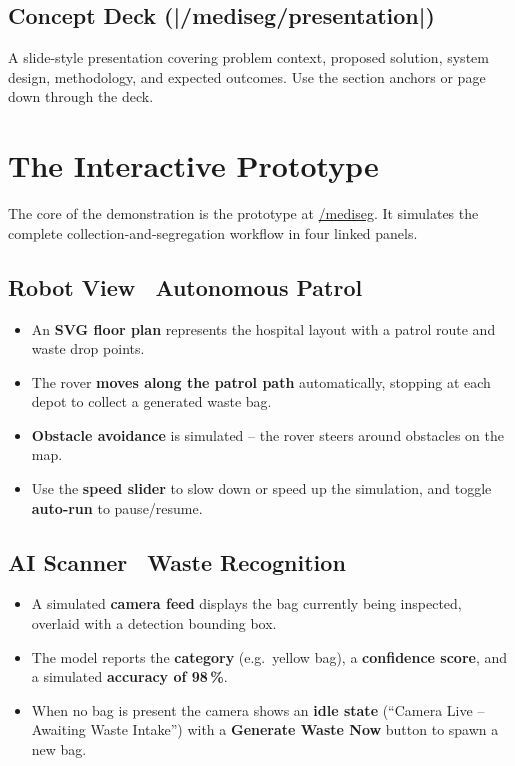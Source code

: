 \documentclass[11pt, a4paper]{article}
\begin{document}
\subsection{Concept Deck (|/mediseg/presentation|)}
A slide-style presentation covering problem context, proposed solution,
system design, methodology, and expected outcomes. Use the section anchors or
page down through the deck.

\section{The Interactive Prototype}

The core of the demonstration is the prototype at \url{/mediseg}. It simulates
the complete collection-and-segregation workflow in four linked panels.

\subsection{Robot View \textperiodcentered\ Autonomous Patrol}
\begin{itemize}[leftmargin=1.6em, itemsep=2pt]
  \item An \textbf{SVG floor plan} represents the hospital layout with a patrol
        route and waste drop points.
  \item The rover \textbf{moves along the patrol path} automatically, stopping
        at each depot to collect a generated waste bag.
  \item \textbf{Obstacle avoidance} is simulated -- the rover steers around
        obstacles on the map.
  \item Use the \textbf{speed slider} to slow down or speed up the simulation,
        and toggle \textbf{auto-run} to pause/resume.
\end{itemize}

\subsection{AI Scanner \textperiodcentered\ Waste Recognition}
\begin{itemize}[leftmargin=1.6em, itemsep=2pt]
  \item A simulated \textbf{camera feed} displays the bag currently being
        inspected, overlaid with a detection bounding box.
  \item The model reports the \textbf{category} (e.g.\ yellow bag), a
        \textbf{confidence score}, and a simulated \textbf{accuracy of 98\,\%}.
  \item When no bag is present the camera shows an \textbf{idle state}
        (``Camera Live -- Awaiting Waste Intake'') with a
        \textbf{Generate Waste Now} button to spawn a new bag.
\end{itemize}
\end{document}
